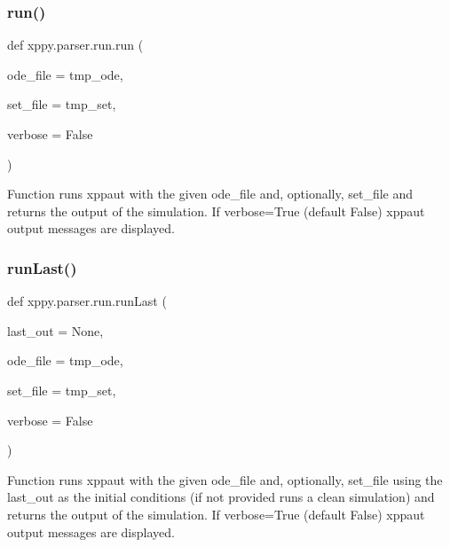 \subsubsection{\texorpdfstring{run()}{run()}}
{\footnotesize\ttfamily def xppy.\+parser.\+run.\+run (\begin{DoxyParamCaption}\item[{}]{ode\+\_\+file = {\ttfamily tmp\+\_\+ode},  }\item[{}]{set\+\_\+file = {\ttfamily tmp\+\_\+set},  }\item[{}]{verbose = {\ttfamily False} }\end{DoxyParamCaption})}

\begin{DoxyVerb}Function runs xppaut with the given ode_file and, optionally, set_file and
returns the output of the simulation.
If verbose=True (default False) xppaut output messages are displayed. 
\end{DoxyVerb}
 \mbox{\label{namespacexppy_1_1parser_1_1run_ae60fb82821ae368a7b5cf41169ee9047}} 
\subsubsection{\texorpdfstring{run\+Last()}{runLast()}}
{\footnotesize\ttfamily def xppy.\+parser.\+run.\+run\+Last (\begin{DoxyParamCaption}\item[{}]{last\+\_\+out = {\ttfamily None},  }\item[{}]{ode\+\_\+file = {\ttfamily tmp\+\_\+ode},  }\item[{}]{set\+\_\+file = {\ttfamily tmp\+\_\+set},  }\item[{}]{verbose = {\ttfamily False} }\end{DoxyParamCaption})}

\begin{DoxyVerb}Function runs xppaut with the given ode_file and, optionally, set_file using 
the last_out as the initial conditions (if not provided runs a clean simulation)
and returns the output of the simulation.
If verbose=True (default False) xppaut output messages are displayed. 
\end{DoxyVerb}
 